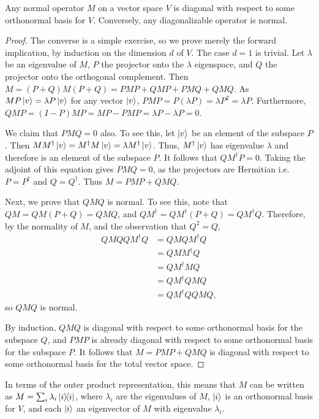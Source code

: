 \begin{theorem}
  Any normal operator $M$ on a vector space $V$ is diagonal with respect to
  some orthonormal basis for $V$. Conversely, any diagonalizable operator is
  normal.
\end{theorem}
\begin{proof}
  The converse is a simple exercise, so we prove merely the forward
  implication, by induction on the dimension $d$ of $V$. The case $d = 1$ is
  trivial. Let $\lambda$ be an eigenvalue of $M$, $P$ the projector onto the
  $\lambda$ eigenspace, and $Q$ the projector onto the orthogonal complement.
  Then $M = (P + Q)M(P + Q) = PMP + QMP + PMQ + QMQ$. As $MP\ket{v} = \lambda P
  \ket{v}$ for any vector $\ket{v}$, $PMP = P(\lambda P) = \lambda P^2 =
  \lambda P$. Furthermore, $QMP = (I - P)MP = MP - PMP = \lambda P - \lambda P
  = 0$.

  We claim that $PMQ = 0$ also. To see this, let $\ket{v}$ be an element of the
  subspace $P$. Then $M M^\dagger \ket{v} = M^\dagger M \ket{v} = \lambda
  M^\dagger \ket{v}$. Thus, $M^\dagger \ket{v}$ has eigenvalue $\lambda$ and
  therefore is an element of the subspace $P$. It follows that $Q M^\dagger P =
  0$. Taking the adjoint of this equation gives $PMQ = 0$, as the projectors
  are Hermitian i.e. $P = P^\dagger$ and $Q = Q^\dagger$. Thus $M = PMP + QMQ$.

  Next, we prove that $QMQ$ is normal. To see this, note that $QM = QM(P + Q) =
  QMQ$, and $Q M^\dagger = Q M^\dagger (P+Q) = Q M^\dagger Q$. Therefore, by
  the normality of $M$, and the observation that $Q^2 = Q$, \begin{align*}
    Q M Q Q M^\dagger Q &= Q M Q M^\dagger Q \\
      &= Q M M^\dagger Q \\
      &= Q M^\dagger M Q \\
      &= Q M^\dagger Q M Q \\
      &= Q M^\dagger Q Q M Q,
  \end{align*} so $QMQ$ is normal.

  By induction, $QMQ$ is diagonal with respect to some orthonormal basis for
  the subspace $Q$, and $PMP$ is already diagonal with respect to some
  orthonormal basis for the subspace $P$. It follows that $M = PMP + QMQ$ is
  diagonal with respect to some orthonormal basis for the total vector space.
\end{proof}

In terms of the outer product representation, this means that $M$ can be
written as $M = \sum_i \lambda_i \ketbra{i}{i}$, where $\lambda_i$ are the
eigenvalues of $M$, $\ket{i}$ is an orthonormal basis for $V$, and each
$\ket{i}$ an eigenvector of $M$ with eigenvalue $\lambda_i$.

